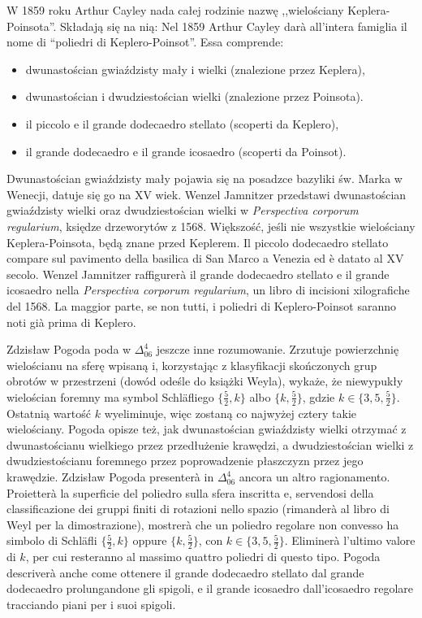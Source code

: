 W 1859 roku Arthur Cayley nada całej rodzinie nazwę ,,wielościany Keplera-Poinsota''. %
Składają się na nią: %
Nel 1859 Arthur Cayley darà all'intera famiglia il nome di ``poliedri di Keplero-Poinsot''. %
Essa comprende: %
\begin{itemize}
    \item dwunastościan gwiaździsty mały i wielki (znalezione przez Keplera), %
    \item dwunastościan i dwudziestościan wielki (znalezione przez Poinsota). %
    \item il piccolo e il grande dodecaedro stellato (scoperti da Keplero), %
    \item il grande dodecaedro e il grande icosaedro (scoperti da Poinsot). %
\end{itemize}

Dwunastościan gwiaździsty mały pojawia się na posadzce bazyliki św. Marka w Wenecji, datuje się go na XV wiek. %
Wenzel Jamnitzer przedstawi dwunastościan gwiaździsty wielki oraz dwudziestościan wielki w \emph{Perspectiva corporum regularium}, księdze drzeworytów z 1568. %
Większość, jeśli nie wszystkie wielościany Keplera-Poinsota, będą znane przed Keplerem. %
Il piccolo dodecaedro stellato compare sul pavimento della basilica di San Marco a Venezia ed è datato al XV secolo. %
Wenzel Jamnitzer raffigurerà il grande dodecaedro stellato e il grande icosaedro nella \emph{Perspectiva corporum regularium}, un libro di incisioni xilografiche del 1568. %
La maggior parte, se non tutti, i poliedri di Keplero-Poinsot saranno noti già prima di Keplero. %

Zdzisław Pogoda poda w $\Delta_{06}^{4}$ jeszcze inne rozumowanie. %
Zrzutuje powierzchnię wielościanu na sferę wpisaną i, korzystając z klasyfikacji skończonych grup obrotów w przestrzeni (dowód odeśle do książki Weyla), wykaże, że niewypukły wielościan foremny ma symbol Schläfliego $\{\frac52, k\}$ albo $\{k, \frac52\}$, gdzie $k \in \{3, 5, \frac52\}$. %
Ostatnią wartość $k$ wyeliminuje, więc zostaną co najwyżej cztery takie wielościany. %
Pogoda opisze też, jak dwunastościan gwiaździsty wielki otrzymać z dwunastościanu wielkiego przez przedłużenie krawędzi, a dwudziestościan wielki z dwudziestościanu foremnego przez poprowadzenie płaszczyzn przez jego krawędzie. %
Zdzisław Pogoda presenterà in $\Delta_{06}^{4}$ ancora un altro ragionamento. %
Proietterà la superficie del poliedro sulla sfera inscritta e, servendosi della classificazione dei gruppi finiti di rotazioni nello spazio (rimanderà al libro di Weyl per la dimostrazione), mostrerà che un poliedro regolare non convesso ha simbolo di Schläfli $\{\frac52, k\}$ oppure $\{k, \frac52\}$, con $k \in \{3, 5, \frac52\}$. %
Eliminerà l'ultimo valore di $k$, per cui resteranno al massimo quattro poliedri di questo tipo. %
Pogoda descriverà anche come ottenere il grande dodecaedro stellato dal grande dodecaedro prolungandone gli spigoli, e il grande icosaedro dall'icosaedro regolare tracciando piani per i suoi spigoli. %

%